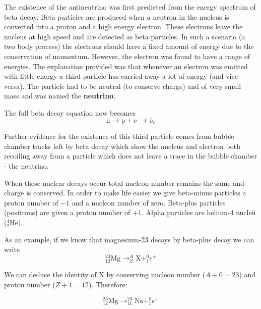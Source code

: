 \documentclass[main.tex]{subfiles}
\begin{document}

The existence of the antineutrino was first predicted from the energy spectrum of beta decay. Beta particles are produced when a neutron in the nucleus is converted into a proton and a high energy electron. These electrons leave the nucleus at high speed and are detected as beta particles. In such a scenario (a two body process) the electrons should have a fixed amount of energy due to the conservation of momentum. However, the electron was found to have a range of energies. The explanation provided was that whenever an electron was emitted with little energy a third particle has carried away a lot of energy (and vice-versa). The particle had to be neutral (to conserve charge) and of very small mass and was named the \textbf{neutrino}.

The full beta decay equation now becomes
\[ \text{n} \rightarrow \text{p} + \text{e}^- + \overline{\nu}_\text{e} \]

Further evidence for the existence of this third particle comes from bubble chamber tracks left by beta decay which show the nucleus and electron both recoiling away from a particle which does not leave a trace in the bubble chamber - the neutrino.


When these nuclear decays occur total nucleon number remains the same and charge is conserved. In order to make life easier we give beta-minus particles a proton number of $-1$ and a nucleon number of zero. Beta-plus particles (positrons) are given a proton number of $+1$. Alpha particles are helium-4 nucleii ($_2^4\text{He}$).

As an example, if we know that magnesium-23 decays by beta-plus decay we can write
\[ _{12}^{23}\text{Mg} \rightarrow _Z^A\text{X} + _{1}^{0}e^+ \]

We can deduce the identity of X by conserving nucleon number ($A+0=23$) and proton number ($Z+1 = 12$). Therefore:

\[ _{12}^{23}\text{Mg} \rightarrow _{11}^{23}\text{Na} + _{1}^{0}e^+ \]

\end{document}
